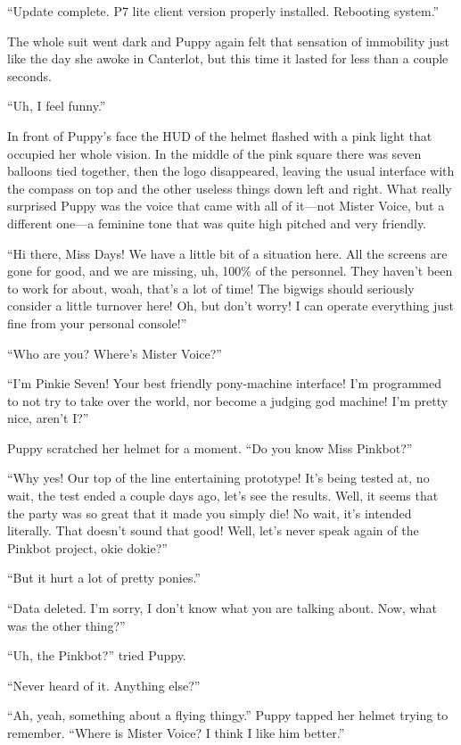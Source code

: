 {\mt ``Update complete. P7 lite client version properly installed. Rebooting system.''}

The whole suit went dark and Puppy again felt that sensation of immobility just like the day she awoke in Canterlot, but this time it lasted for less than a couple seconds.

``Uh, I feel funny.''

In front of Puppy's face the HUD of the helmet flashed with a pink light that occupied her whole vision. In the middle of the pink square there was seven balloons tied together, then the logo disappeared, leaving the usual interface with the compass on top and the other useless things down left and right. What really surprised Puppy was the voice that came with all of it---not Mister Voice, but a different one---a feminine tone that was quite high pitched and very friendly.

``Hi there, Miss Days! We have a little bit of a situation here. All the screens are gone for good, and we are missing, uh, 100\% of the personnel. They haven't been to work for about, woah, that's a lot of time! The bigwigs should seriously consider a little turnover here! Oh, but don't worry! I can operate everything just fine from your personal console!''

``Who are you? Where's Mister Voice?''

``I'm Pinkie Seven! Your best friendly pony-machine interface! I'm programmed to not try to take over the world, nor become a judging god machine! I'm pretty nice, aren't I?''

Puppy scratched her helmet for a moment. ``Do you know Miss Pinkbot?''

``Why yes! Our top of the line entertaining prototype! It's being tested at, no wait, the test ended a couple days ago, let's see the results. Well, it seems that the party was so great that it made you simply die! No wait, it's intended literally. That doesn't sound that good! Well, let's never speak again of the Pinkbot project, okie dokie?''

``But it hurt a lot of pretty ponies.''

``Data deleted. I'm sorry, I don't know what you are talking about. Now, what was the other thing?''

``Uh, the Pinkbot?'' tried Puppy.

``Never heard of it. Anything else?''

``Ah, yeah, something about a flying thingy.'' Puppy tapped her helmet trying to remember. ``Where is Mister Voice? I think I like him better.''

